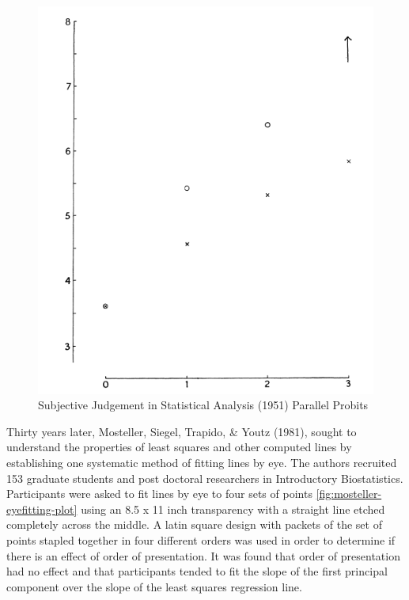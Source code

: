 \documentclass[print]{nuthesis}
\begin{document}
\begin{figure}[tbp]

{\centering \includegraphics[width=0.5\linewidth,]{images/subjective-judgement-plot} 

}

\caption{Subjective Judgement in Statistical Analysis (1951) Parallel Probits}\label{fig:subjective-judgement}
\end{figure}

Thirty years later, Mosteller, Siegel, Trapido, \& Youtz (1981), sought to understand the properties of least squares and other computed lines by establishing one systematic method of fitting lines by eye.
The authors recruited 153 graduate students and post doctoral researchers in Introductory Biostatistics.
Participants were asked to fit lines by eye to four sets of points \cref{fig:mosteller-eyefitting-plot} using an 8.5 x 11 inch transparency with a straight line etched completely across the middle.
A latin square design with packets of the set of points stapled together in four different orders was used in order to determine if there is an effect of order of presentation.
It was found that order of presentation had no effect and that participants tended to fit the slope of the first principal component over the slope of the least squares regression line.
\end{document}
